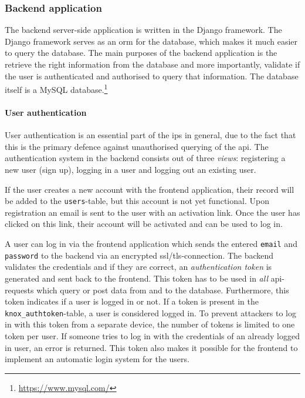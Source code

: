 \subsubsection{Backend application}\label{sec:backend-application}
The backend server-side application is written in the Django framework. The Django framework serves as an \ac{orm} for the database, which makes it much easier to query the database. The main purposes of the backend application is the retrieve the right information from the database and more importantly, validate if the user is authenticated and authorised to query that information. The database itself is a MySQL database.\footnote{\url{https://www.mysql.com/}} 

\paragraph{User authentication}
User authentication is an essential part of the \ac{ips} in general, due to the fact that this is the primary defence against unauthorised querying of the \ac{api}. The authentication system in the backend consists out of three \textit{views}: registering a new user (sign up), logging in a user and logging out an existing user. 

\ind If the user creates a new account with the frontend application, their record will be added to the \texttt{users}-table, but this account is not yet functional. Upon registration an email is sent to the user with an activation link. Once the user has clicked on this link, their account will be activated and can be used to log in.

\ind A user can log in via the frontend application which sends the entered \texttt{email} and \texttt{password} to the backend via an encrypted \ac{ssl}/\ac{tls}-connection. The backend validates the credentials and if they are correct, an \textit{authentication token} is generated and sent back to the frontend. This token has to be used in \textit{all} \ac{api}-requests which query or post data from and to the database. Furthermore, this token indicates if a user is logged in or not. If a token is present in the \verb|knox_authtoken|-table, a user is considered logged in. To prevent attackers to log in with this token from a separate device, the number of tokens is limited to one token per user. If someone tries to log in with the credentials of an already logged in user, an error is returned. This token also makes it possible for the frontend to implement an automatic login system for the users.

